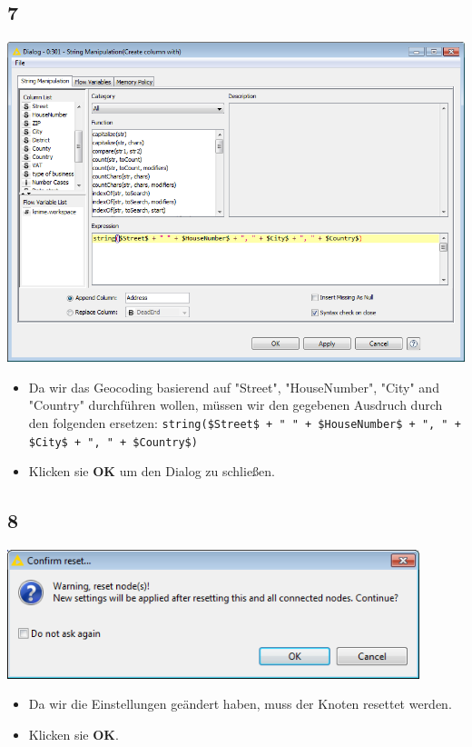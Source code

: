 \documentclass{beamer}
\begin{document}
\subsection{7}
\begin{frame}
	\begin{center}
  		\includegraphics[height=0.5\textheight]{7.png}
	\end{center}
	\begin{itemize}
		\item Da wir das Geocoding basierend auf "Street", "HouseNumber", "City" and "Country" durchführen wollen, müssen wir den gegebenen Ausdruch durch den folgenden ersetzen: \texttt{string(\$Street\$ + " " + \$HouseNumber\$ + ", " + \$City\$ + ", " + \$Country\$)}
		\item Klicken sie \textbf{OK} um den Dialog zu schließen.
	\end{itemize}
\end{frame}

\subsection{8}
\begin{frame}
	\begin{center}
  		\includegraphics[width=0.9\textwidth]{8.png}
	\end{center}
	\begin{itemize}
		\item Da wir die Einstellungen geändert haben, muss der Knoten resettet werden. 
		\item Klicken sie \textbf{OK}.
	\end{itemize}
\end{frame}
\end{document}
